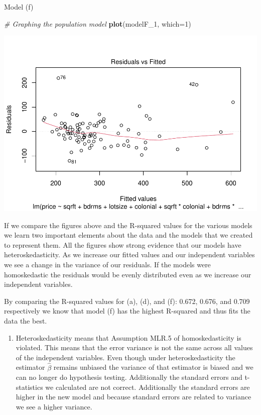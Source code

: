 \documentclass[
  12pt,
  landscape]{article}
\newenvironment{Shaded}{\begin{snugshade}}{\end{snugshade}}
\newcommand{\CommentTok}[1]{\textcolor[rgb]{0.56,0.35,0.01}{\textit{#1}}}
\newcommand{\DataTypeTok}[1]{\textcolor[rgb]{0.13,0.29,0.53}{#1}}
\newcommand{\DecValTok}[1]{\textcolor[rgb]{0.00,0.00,0.81}{#1}}
\newcommand{\KeywordTok}[1]{\textcolor[rgb]{0.13,0.29,0.53}{\textbf{#1}}}
\newcommand{\NormalTok}[1]{#1}
\providecommand{\tightlist}{%
  \setlength{\itemsep}{0pt}\setlength{\parskip}{0pt}}
\begin{document}
Model (f)

\begin{Shaded}
\begin{Highlighting}[]
\CommentTok{# Graphing the population model }
\KeywordTok{plot}\NormalTok{(modelF_}\DecValTok{1}\NormalTok{, }\DataTypeTok{which=}\DecValTok{1}\NormalTok{)}
\end{Highlighting}
\end{Shaded}

\includegraphics{Ogle_MicroMetricsAssignment_2_Q1_files/figure-latex/unnamed-chunk-17-1.pdf}

If we compare the figures above and the R-squared values for the various
models we learn two important elements about the data and the models
that we created to represent them. All the figures show strong evidence
that our models have heteroskedasticity. As we increase our fitted
values and our independent variables we see a change in the variance of
our residuals. If the models were homoskedastic the residuals would be
evenly distributed even as we increase our independent variables.

By comparing the R-squared values for (a), (d), and (f): 0.672, 0.676,
and 0.709 respectively we know that model (f) has the highest R-squared
and thus fits the data the best.

\begin{enumerate}
\def\labelenumi{(\alph{enumi})}
\setcounter{enumi}{7}
\tightlist
\item
  Heteroskedasticity means that Assumption MLR.5 of homoskedasticity is
  violated. This means that the error variance is not the same across
  all values of the independent variables. Even though under
  heteroskedasticity the estimator \(\hat\beta\) remains unbiased the
  variance of that estimator is biased and we can no longer do
  hypothesis testing. Additionally the standard errors and t-statistics
  we calculated are not correct. Additionally the standard errors are
  higher in the new model and because standard errors are related to
  variance we see a higher variance.
\end{enumerate}
\end{document}
